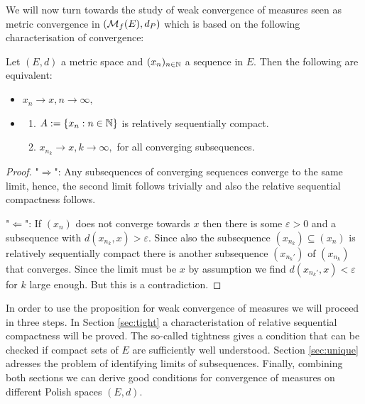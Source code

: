 We will now turn towards the study of weak convergence of measures seen as metric convergence in $(\mathcal{M}_f(E),d_P)$ which is based on the following characterisation of convergence:
\begin{lsatzwichtig}
\begin{prop}\label{propkonvergenz}
	Let $(E,d)$ a metric space and $(x_n)_{n\in\mathbb{N}}$ a sequence in $E$. Then the following are equivalent:
	\begin{itemize}
		\item $x_n\to x, n\to\infty,$
		\item 
		\begin{enumerate}[label=(\roman*)]
			\item $A:=\{x_n:n\in\mathbb{N}\}$ is relatively sequentially compact.
			\item $x_{n_k}\to x,k\to\infty,$ for all converging subsequences.
		\end{enumerate}
	\end{itemize}
\end{prop}
\end{lsatzwichtig}
\begin{proof}[Proof]
	"$\Rightarrow$": Any subsequences of converging sequences converge to the same limit, hence, the second limit follows trivially and also the relative sequential compactness follows.\smallskip
	
	"$\Leftarrow$": If $(x_n)$ does not converge towards $x$ then there is some $\varepsilon>0$ and a subsequence with $d(x_{n_k},x)>\varepsilon$. Since also the subsequence $(x_{n_k})\subseteq (x_n)$ is relatively sequentially compact there is another subsequence $(x_{n_k'})$ of $(x_{n_k})$ that converges. Since the limit must be $x$ by assumption we find $d(x_{n_k'},x)<\varepsilon$ for $k$ large enough. But this is a contradiction.
\end{proof}
In order to use the proposition for weak convergence of measures we will proceed in three steps. In Section \ref{sec:tight} a characteristation of relative sequential compactness will be proved. The so-called tightness gives a condition that can be checked if compact sets of $E$ are sufficiently well understood. Section \ref{sec:unique} adresses the problem of identifying limits of subsequences. Finally, combining both sections we can derive good conditions for convergence of measures on different Polish spaces $(E,d)$. 


	\marginpar{\textcolor{red}{Lecture 13}}

